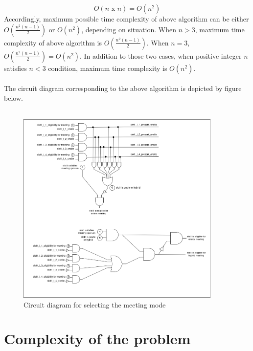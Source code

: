 \[ O(n \text{ x } n) = O(n^2) \] 
Accordingly, maximum possible time complexity of above algorithm can be either $O(\frac{n^2(n - 1)}{2})$ or $O(n^2)$, depending on situation. When $n > 3$, maximum time complexity of above algorithm is $O(\frac{n^2(n - 1)}{2})$. When $n = 3$, $O(\frac{n^2(n - 1)}{2}) = O(n^2)$. In addition to those two cases, when positive integer $n$ satisfies $n < 3$ condition, maximum time complexity is $O(n^2)$.\\ \\
The circuit diagram corresponding to the above algorithm is depicted by figure below.\\ \\
\begin{figure}[H]
    \centering
    \includegraphics[width=0.9\textwidth]{./image/circuit_diagram/5_meeting_mode_selection.png}
    \caption{Circuit diagram for selecting the meeting mode}
    \label{fig:circuit diagram for selecting the meeting mode}
\end{figure}

\section{Complexity of the problem}

